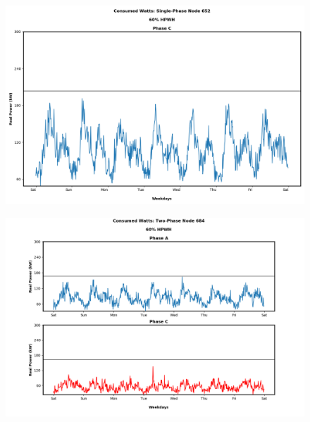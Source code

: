 \begin{figure}[H]
    \centering
    \includegraphics[width=1.1\columnwidth]{Pictures/sixty_single_phase_652_power.png}
    \caption{ }
\end{figure}

\newpage

\begin{figure}[H]
    \centering
    \includegraphics[width=1.1\columnwidth]{Pictures/sixty_two_phase_684_power.png}
    \caption{ }
\end{figure}

\newpage

